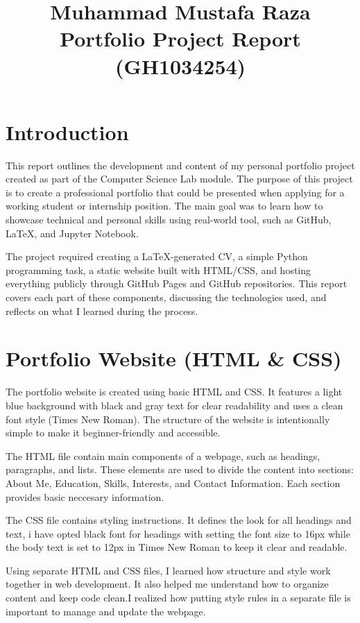 \documentclass[14pt]{article}
\title{Muhammad Mustafa Raza Portfolio Project Report (GH1034254)}
\author{}
\date{}
\begin{document}
\maketitle

\section*{Introduction}
This report outlines the development and content of my personal portfolio project created as part of the Computer Science Lab module. The purpose of this project is to create a professional portfolio that could be presented when applying for a working student or internship position. The main goal was to learn how to showcase technical and personal skills using real-world tool, such as GitHub, LaTeX, and Jupyter Notebook.

The project required creating a LaTeX-generated CV, a simple Python programming task, a static website built with HTML/CSS, and hosting everything publicly through GitHub Pages and GitHub repositories. This report covers each part of these components, discussing the technologies used, and reflects on what I learned during the process.

\section*{Portfolio Website (HTML \& CSS)}
The portfolio website is created using basic HTML and CSS. It features a light blue background with black and gray text for clear readability and uses a clean font style (Times New Roman). The structure of the website is intentionally simple to make it beginner-friendly and accessible.

The HTML file contain main components of a webpage, such as headings, paragraphs, and lists. These elements are used to divide the content into  sections: About Me, Education, Skills, Interests, and Contact Information. Each section provides basic neccesary information.

The CSS file contains styling instructions. It defines the look for all headings and text, i have opted black font for headings with setting the font size to 16px while the body text is set to 12px in Times New Roman to keep it clear and readable. 

Using separate HTML and CSS files, I learned how structure and style work together in web development. It also helped me understand how to organize content and keep code clean.I realized how putting style rules in a separate file is important to manage and update the webpage.
\end{document}
